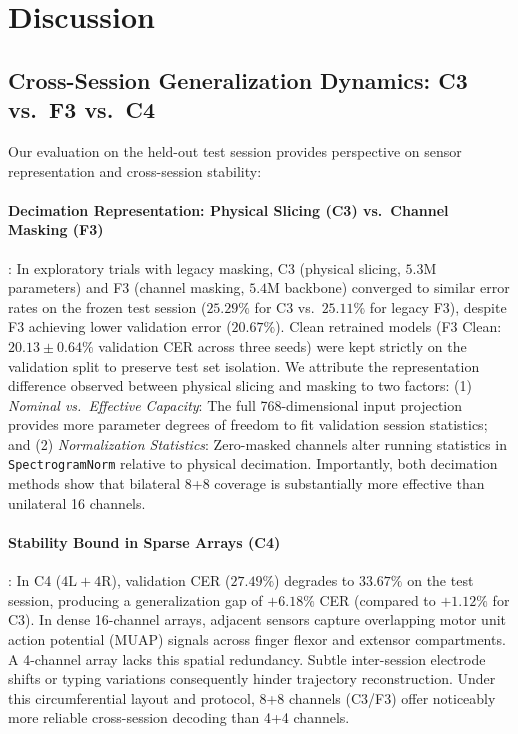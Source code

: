 \documentclass{article}
\begin{document}
\section{Discussion}
\label{sec:discussion}

\subsection{Cross-Session Generalization Dynamics: C3 vs.\ F3 vs.\ C4}
Our evaluation on the held-out test session provides perspective on sensor representation and cross-session stability:

\paragraph{Decimation Representation: Physical Slicing (C3) vs.\ Channel Masking (F3)}:
In exploratory trials with legacy masking, C3 (physical slicing, $5.3\text{M}$ parameters) and F3 (channel masking, $5.4\text{M}$ backbone) converged to similar error rates on the frozen test session ($25.29\%$ for C3 vs.\ $25.11\%$ for legacy F3), despite F3 achieving lower validation error ($20.67\%$). Clean retrained models (F3 Clean: $20.13 \pm 0.64\%$ validation CER across three seeds) were kept strictly on the validation split to preserve test set isolation. We attribute the representation difference observed between physical slicing and masking to two factors: (1) \textit{Nominal vs.\ Effective Capacity}: The full 768-dimensional input projection provides more parameter degrees of freedom to fit validation session statistics; and (2) \textit{Normalization Statistics}: Zero-masked channels alter running statistics in \texttt{SpectrogramNorm} relative to physical decimation. Importantly, both decimation methods show that bilateral 8+8 coverage is substantially more effective than unilateral 16 channels.

\paragraph{Stability Bound in Sparse Arrays (C4)}:
In C4 ($4\text{L}+4\text{R}$), validation CER ($27.49\%$) degrades to $33.67\%$ on the test session, producing a generalization gap of $\mathbf{+6.18\%}$ CER (compared to $+1.12\%$ for C3). In dense 16-channel arrays, adjacent sensors capture overlapping motor unit action potential (MUAP) signals across finger flexor and extensor compartments. A 4-channel array lacks this spatial redundancy. Subtle inter-session electrode shifts or typing variations consequently hinder trajectory reconstruction. Under this circumferential layout and protocol, 8+8 channels (C3/F3) offer noticeably more reliable cross-session decoding than 4+4 channels.
\end{document}
